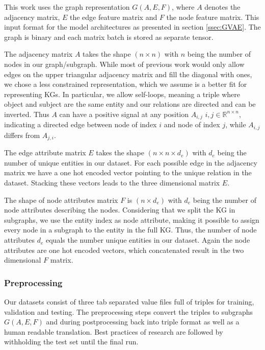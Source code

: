 This work uses the graph representation $G(A,E,F)$, where $A$ denotes the adjacency matrix, $E$ the edge feature matrix and $F$ the node feature matrix. This input format for the model architectures as presented in section \ref{ssec:GVAE}. The graph is binary and each matrix batch is stored as separate tensor.

The adjacency matrix $A$ takes the shape $(n\times n)$ with $n$ being the number of nodes in our graph/subgraph. While most of previous work would only allow edges on the upper triangular adjacency matrix and fill the diagonal with ones, we chose a less constrained representation, which we assume is a better fit for representing KGs. In particular, we allow self-loops, meaning a triple where object and subject are the same entity and our relations are directed and can be inverted. Thus $A$ can have a positive signal at any position $A_{i,j}$  $i,j \in \mathbb{R}^{n \times n}$, indicating a directed edge between node of index $i$ and node of index $j$, while $A_{i,j}$ differs from $A_{j,i}$.

The edge attribute matrix $E$ takes the shape $(n\times n\times d_e)$ with $d_e$ being the number of unique entities in our dataset. For each possible edge in the adjacency matrix we have a one hot encoded vector pointing to the unique relation in the dataset. Stacking these vectors leads to the three dimensional matrix $E$.

The shape of node attributes matrix $F$ is $(n\times d_e)$ with $d_e$ being the number of node attributes describing the nodes. Considering that we split the KG in subgraphs, we use the entity index as node attribute, making it possible to assign every node in a subgraph to the entity in the full KG. Thus, the number of node attributes $d_e$ equals the number unique entities in our dataset. Again the node attributes are one hot encoded vectors, which concatenated result in the two dimensional $F$ matrix.


\subsubsection{Preprocessing}
Our datasets consist of three tab separated value files full of triples for training, validation and testing. The preprocessing steps convert the triples to subgraphs $G(A,E,F)$ and during postprocessing back into triple format as well as a human readable translation. Best practices of research are followed by withholding the test set until the final run.

